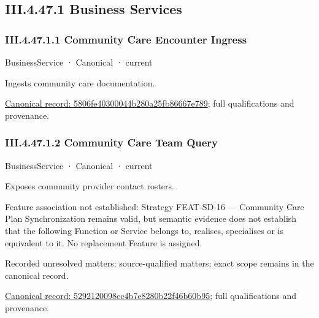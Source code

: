\subsection*{III.4.47.1 Business Services}
\label{navigation:III.4.47.1}

\subsubsection*{III.4.47.1.1 Community Care Encounter Ingress}
\label{navigation:III.4.47.1.1}

\label{element:5806fe40300044b280a25fb86667e789}
{\small BusinessService · Canonical · current}\par

Ingests community care documentation.


{\footnotesize \href{../../../../continuum/business/business-service/5806fe40300044b280a25fb86667e789.md}{Canonical record: 5806fe40300044b280a25fb86667e789}; full qualifications and provenance.}\par
\subsubsection*{III.4.47.1.2 Community Care Team Query}
\label{navigation:III.4.47.1.2}

\label{element:5292120098cc4b7e8280b22f46b60b95}
{\small BusinessService · Canonical · current}\par

Exposes community provider contact rosters.



Feature association not established: Strategy FEAT-SD-16 — Community Care Plan Synchronization remains valid, but semantic evidence does not establish that the following Function or Service belongs to, realises, specialises or is equivalent to it. No replacement Feature is assigned.


{\small Recorded unresolved matters: source-qualified matters; exact scope remains in the canonical record.}\par
{\footnotesize \href{../../../../continuum/business/business-service/5292120098cc4b7e8280b22f46b60b95.md}{Canonical record: 5292120098cc4b7e8280b22f46b60b95}; full qualifications and provenance.}\par
